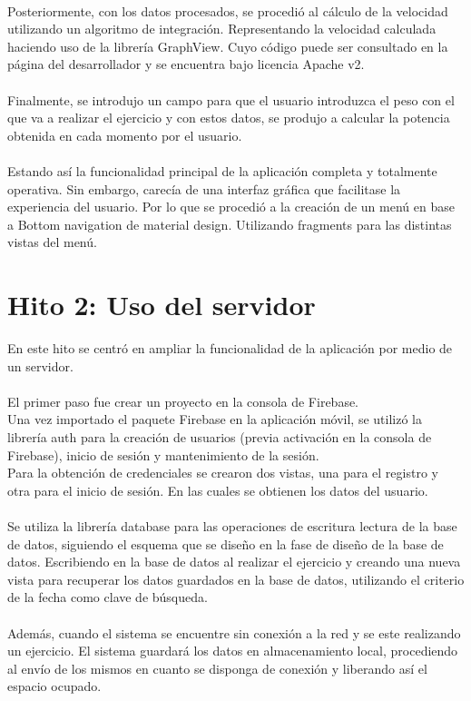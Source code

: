 \\
Posteriormente, con los datos procesados, se procedió al cálculo de la velocidad utilizando un algoritmo de integración. Representando la velocidad calculada haciendo uso de la librería GraphView\cite{graphview}. Cuyo código puede ser consultado en la página del desarrollador y se encuentra bajo licencia Apache v2.
\\
\\
Finalmente, se introdujo un campo para que el usuario introduzca el peso con el que va a realizar el ejercicio y con estos datos, se produjo a calcular la potencia obtenida en cada momento por el usuario.
\\
\\
Estando así la funcionalidad principal de la aplicación completa y totalmente operativa. Sin embargo, carecía de una interfaz gráfica que facilitase la experiencia del usuario. Por lo que se procedió a la creación de un menú  en base a Bottom navigation de material design\cite{navigation}. Utilizando fragments para las distintas vistas del menú.

\section{Hito 2: Uso del servidor}

En este hito se centró en ampliar la funcionalidad de la aplicación por medio de un servidor.
\\
\\
El primer paso fue crear un proyecto en la consola de Firebase.
\\
Una vez importado el paquete Firebase en la aplicación móvil, se utilizó la librería auth para la creación de usuarios (previa activación en la consola de Firebase), inicio de sesión y mantenimiento de la sesión.
\\
Para la obtención de credenciales se crearon dos vistas, una para el registro y otra para el inicio de sesión. En las cuales se obtienen los datos del usuario.
\\
\\
Se utiliza la librería database para las operaciones de escritura lectura de la base de datos, siguiendo el esquema que se diseño en la fase de diseño de la base de datos. Escribiendo en la base de datos al realizar el ejercicio y creando una nueva vista para recuperar los datos guardados en la base de datos, utilizando el criterio de la fecha como clave de búsqueda.
\\
\\
Además, cuando el sistema se encuentre sin conexión a la red y se este realizando un ejercicio. El sistema guardará los datos en almacenamiento local, procediendo al envío de los mismos en cuanto se disponga de conexión y liberando así el espacio ocupado.

